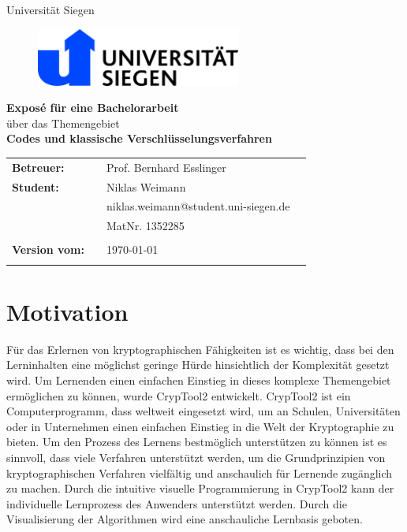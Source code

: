 \documentclass[fontsize=11pt, paper=a4, parskip=half]{scrartcl}
\begin{document}
\thispagestyle{empty}

\begin{center}
\Large{Universität Siegen}\\
\end{center}

\begin{figure}[t]
 \centering
 \includegraphics[width=0.6\textwidth]{images/uni-siegen.jpg}
\end{figure}

\vspace{2.5cm}
\begin{center}
\textbf{\LARGE{Exposé für eine Bachelorarbeit}}\\
\Large{über das Themengebiet}\\
\textbf{\LARGE{Codes und klassische Verschlüsselungsverfahren}}\\
\end{center}
\vspace{6cm}
\begin{flushleft}
\begin{tabular}{llll}
\textbf{Betreuer:} & & Prof. Bernhard Esslinger  & \\
\textbf{Student:} & & Niklas Weimann & \\
& & niklas.weimann@student.uni-siegen.de & \\
& & MatNr. 1352285 & \\
& & \\
\textbf{Version vom:} & & \today &\\
& & \\
\end{tabular}
\end{flushleft}
\newpage

\tableofcontents
\newpage

\section{Motivation}
Für das Erlernen von kryptographischen Fähigkeiten ist es wichtig, dass bei den Lerninhalten eine möglichst geringe Hürde hinsichtlich der Komplexität gesetzt wird. Um Lernenden einen einfachen Einstieg in dieses komplexe Themengebiet ermöglichen zu können, wurde CrypTool2 entwickelt. CrypTool2 ist ein Computerprogramm, dass weltweit eingesetzt wird, um an Schulen, Universitäten oder in Unternehmen einen einfachen Einstieg in die Welt der Kryptographie zu bieten. Um den Prozess des Lernens bestmöglich unterstützen zu können ist es sinnvoll, dass viele Verfahren unterstützt werden, um die Grundprinzipien von kryptographischen Verfahren vielfältig und anschaulich für Lernende zugänglich zu machen. Durch die intuitive visuelle Programmierung in CrypTool2 kann der individuelle Lernprozess des Anwenders unterstützt werden. Durch die Visualisierung der Algorithmen wird eine anschauliche Lernbasis geboten.
\end{document}
